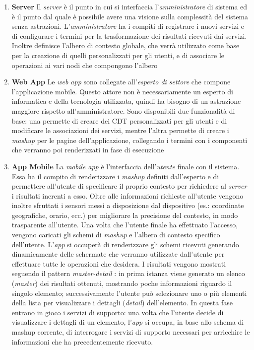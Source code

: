 \begin{enumerate}
	\item \textbf{Server}
	Il \emph{server} è il punto in cui si interfaccia l'\emph{amministratore} di sistema ed è il punto dal quale è possibile avere una visione sulla complessità del sistema senza astrazioni. L'\emph{amministratore} ha i compiti di registrare i nuovi servizi e di configurare i termini per la trasformazione dei risultati ricevuti dai servizi. Inoltre definisce l'albero di contesto globale, che verrà utilizzato come base per la creazione di quelli personalizzati per gli utenti, e di associare le operazioni ai vari nodi che compongono l'albero
	\item \textbf{Web App}
	Le \emph{web app} sono collegate all'\emph{esperto di settore} che compone l'applicazione mobile. Questo attore non è necessariamente un esperto di informatica e della tecnologia utilizzata, quindi ha bisogno di un astrazione maggiore rispetto all'amministratore. Sono disponibili due funzionalità di base: una permette di creare dei CDT personalizzati per gli utenti e di modificare le associazioni dei servizi, mentre l'altra permette di creare i \emph{mashup} per le pagine dell'applicazione, collegando i termini con i componenti che verranno poi renderizzati in fase di esecuzione
	\item \textbf{App Mobile}
	La \emph{mobile app} è l'interfaccia dell'\emph{utente} finale con il sistema. Essa ha il compito di renderizzare i \emph{mashup} definiti dall'esperto e di permettere all'utente di specificare il proprio contesto per richiedere al \emph{server} i risultati inerenti a esso. Oltre alle informazioni richieste all'utente vengono inoltre sfruttati i sensori messi a disposizione dal dispositivo (es.: coordinate geografiche, orario, ecc.) per migliorare la precisione del contesto, in modo trasparente all'utente.
	Una volta che l'utente finale ha effettuato l'accesso, vengono caricati gli schemi di \emph{mashup} e l'albero di contesto specifico dell'utente. L'\emph{app} si occuperà di renderizzare gli schemi ricevuti generando dinamicamente delle schermate che verranno utilizzate dall'utente per effettuare tutte le operazioni che desidera.
	I risultati vengono mostrati seguendo il pattern \emph{master-detail} \cite{molina2002user}: in prima istanza viene generato un elenco (\emph{master}) dei risultati ottenuti, mostrando poche informazioni riguardo il singolo elemento; successivamente l'utente può selezionare uno o più elementi della lista per visualizzare i dettagli (\emph{detail}) dell'elemento. In questa fase entrano in gioco i servizi di supporto: una volta che l'utente decide di visualizzare i dettagli di un elemento, l'\emph{app} si occupa, in base allo schema di mashup corrente, di interrogare i servizi di supporto necessari per arricchire le informazioni che ha precedentemente ricevuto.
\end{enumerate}

